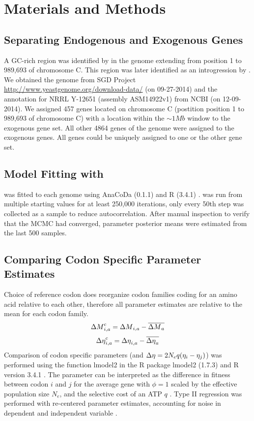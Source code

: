 \documentclass[fleqn,letterpaper]{article}
\begin{document}
\section*{Materials and Methods}

\subsection*{Separating Endogenous and Exogenous Genes}
A GC-rich region was identified by \citet{payen2009} in the \kluyveri genome extending from position 1 to 989,693 of chromosome C.
This region was later identified as an introgression by \citet{friedrich2015}.
We obtained the \kluyveri genome from SGD Project \url{http://www.yeastgenome.org/download-data/} (on 09-27-2014) and the annotation for \kluyveri NRRL Y-12651 (assembly ASM14922v1) from NCBI (on 12-09-2014).
We assigned 457 genes located on chromosome C (postition position 1 to 989,693 of chromosome C) with a location within the $\sim 1 Mb$ window to the exogenous gene set.
All other 4864 genes of the \kluyveri genome were assigned to the exogenous genes.
All genes could be uniquely assigned to one or the other gene set.

\subsection*{Model Fitting with \ROC}
\ROC was fitted to each genome using AnaCoDa (0.1.1) \citep{landerer2018} and R (3.4.1) \citep{rcore}.
\ROC was run from multiple starting values for at least 250,000 iterations, only every 50th step was collected as a sample to reduce autocorrelation. 
After manual inspection to verify that the MCMC had converged, parameter posterior means were estimated from the last 500 samples.

\subsection*{Comparing Codon Specific Parameter Estimates}
Choice of reference codon does reorganize codon families coding for an amino acid relative to each other, therefore all parameter estimates are relative to the mean for each codon family.
\begin{equation}
{\Delta M}_{i,a}^c = {\Delta M}_{i,a} - \overline{{\Delta M}_a}
\end{equation}
\begin{equation}
{\Delta \eta}_{i,a}^c = {\Delta \eta}_{i,a} - \overline{{\Delta \eta}_a}
\end{equation}
Comparison of codon specific parameters (\DM and ${\Delta \eta} = 2N_eq(\eta_i-\eta_j)$) was performed using the function lmodel2 in the R package lmodel2 (1.7.3) \citep{lmodel2} and R version 3.4.1 \citep{rcore}.
The parameter \DE can be interpreted as the difference in fitness between codon $i$ and $j$ for the average gene with $\phi = 1$ scaled by the  effective population size $N_e$, and the selective cost of an ATP $q$ \citep{gilchrist2007, gilchrist2015}.
Type II regression was performed with re-centered parameter estimates, accounting for noise in dependent and independent variable \citep{SokalAndRohlf1981}.
\end{document}
